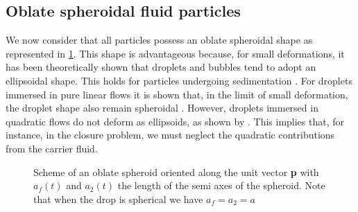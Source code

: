 \subsection{Oblate spheroidal fluid particles}


We now consider that all particles possess an oblate spheroidal shape as represented in \ref{fig:scheme_spheroid}. 
This shape is advantageous because, for small deformations, it has been theoretically shown that droplets and bubbles tend to adopt an ellipsoidal shape. 
This holds for particles undergoing sedimentation \citep{taylor1964deformation}. 
For droplets immersed in pure linear flows it is shown that, in the limit of small deformation, the droplet shape also remain spheroidal \citep{leal2007advanced}. 
However, droplets immersed in quadratic flows do not deform as ellipsoids, as shown by \citet{nadim1991motion}. 
This implies that, for instance, in the closure problem, we must neglect the quadratic contributions from the carrier fluid. 
\begin{figure}[h!]
    \centering
    \hfill
    \hfill
    \caption{Scheme of an  oblate spheroid oriented along the unit vector \textbf{p} with $a_f(t)$ and $a_2(t)$ the length of the semi axes of the spheroid.
    Note that when the drop is spherical we have $a_f=a_2=a$}
    \label{fig:scheme_spheroid}
\end{figure}

